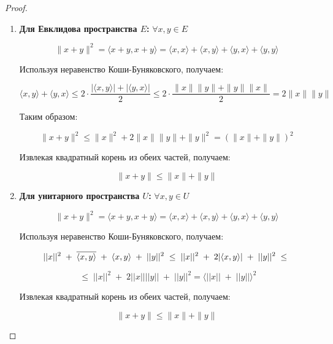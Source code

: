 \vspace{0.2cm}
\begin{proof}
    \begin{enumerate}
        \item \textbf{Для Евклидова пространства \( E \):} \quad \(\forall x, y \in E\)
        
        \[
        \|x + y\|^2 = \langle x + y, x + y \rangle = \langle x, x \rangle + \langle x, y \rangle + \langle y, x \rangle + \langle y, y \rangle
        \]
        
        Используя неравенство Коши-Буняковского, получаем:
        
        \[
        \langle x, y \rangle + \langle y, x \rangle \leq 2 \cdot \frac{|\langle x, y \rangle| + |\langle y, x \rangle|}{2} \leq 2 \cdot \frac{\|x\| \|y\| + \|y\| \|x\|}{2} = 2 \|x\| \|y\|
        \]
        
        Таким образом:
        
        \[
        \|x + y\|^2 \leq \|x\|^2 + 2 \|x\| \|y\| + \|y\|^2 = (\|x\| + \|y\|)^2
        \]
        
        Извлекая квадратный корень из обеих частей, получаем:
        
        \[
        \|x + y\| \leq \|x\| + \|y\|
        \]
        
        \item \textbf{Для унитарного пространства \( U \):} \quad \(\forall x, y \in U\)
        
        \[
        \|x + y\|^2 = \langle x + y, x + y \rangle = \langle x, x \rangle + \langle x, y \rangle + \langle y, x \rangle + \langle y, y \rangle
        \]
        
        Используя неравенство Коши-Буняковского, получаем:
        
        \[
        ||x||^2 \; + \; \overline{\langle x, y \rangle} \; + \; \langle x ,y \rangle \; + \; ||y||^2 \; \leq \; ||x||^2 \; + \; 2 |\langle x,y \rangle | \; + \; ||y||^2  \; \leq \newline 
        \]
        
        $$\; \leq \; ||x||^2 \; + \; 2 ||x|| ||y|| \; + \; ||y||^2 = \langle ||x|| \; + \; ||y|| \rangle^2$$
        
        
        Извлекая квадратный корень из обеих частей, получаем:
        
        
        $$\|x + y\| \leq \|x\| + \|y\|$$
        
   
        
    \end{enumerate}
\end{proof}

